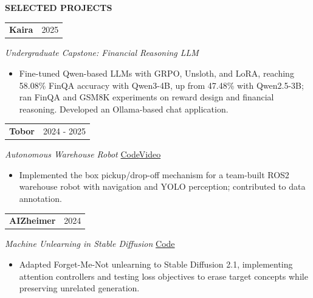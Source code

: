 \documentclass[11pt,a4paper]{article}
\makeatletter
\newcommand{\cvlink}[2]{\href{#1}{\textcolor{linkblue}{#2}}}
\newcommand{\cvsep}{\enspace\textperiodcentered\enspace{}}
\newcommand{\cvsection}[3][5]{%
  \par\Needspace*{#1\baselineskip}\vspace{6pt}%
  {\bfseries\fontsize{11}{13}\selectfont #3}\par\nobreak
  \vspace{3pt}{\color{muted}\hrule height 0.4pt}\nobreak\vspace{6pt}%
}
\newcommand{\cvheading}[2]{%
  \begin{tabularx}{\linewidth}{@{}>{\raggedright\arraybackslash}X@{\hspace{10pt}}r@{}}%
  \textbf{#1} & {\small\color{muted}#2}\\
  \end{tabularx}\par\nobreak
}
\newenvironment{cvpoints}{\begin{itemize}[leftmargin=12pt,itemsep=2pt,topsep=2pt,parsep=0pt]\small}{\end{itemize}}
\makeatother
\begin{document}
\cvsection{}{SELECTED PROJECTS}
\begin{minipage}{\linewidth}\raggedright
\cvheading{Kaira}{2025}
{\small{}\itshape{}\color{muted}Undergraduate Capstone: Financial Reasoning LLM}\hfill{\small{}%
%
}\par\vspace{2pt}
\begin{cvpoints}
\item Fine-tuned Qwen-based LLMs with GRPO, Unsloth, and LoRA, reaching 58.08\% FinQA accuracy with Qwen3-4B, up from 47.48\% with Qwen2.5-3B; ran FinQA and GSM8K experiments on reward design and financial reasoning. Developed an Ollama-based chat application.
\end{cvpoints}
\end{minipage}\par\vspace{5pt}
\begin{minipage}{\linewidth}\raggedright
\cvheading{Tobor}{2024 - 2025}
{\small{}\itshape{}\color{muted}Autonomous Warehouse Robot}\hfill{\small{}%
\mbox{\cvlink{https://github.com/rusen-archive/Amazon-Warehouse-Robot}{Code}}\cvsep\mbox{\cvlink{https://youtu.be/h-Jxs_y9kNA}{Video}}%
}\par\vspace{2pt}
\begin{cvpoints}
\item Implemented the box pickup/drop-off mechanism for a team-built ROS2 warehouse robot with navigation and YOLO perception; contributed to data annotation.
\end{cvpoints}
\end{minipage}\par\vspace{5pt}
\begin{minipage}{\linewidth}\raggedright
\cvheading{AIZheimer}{2024}
{\small{}\itshape{}\color{muted}Machine Unlearning in Stable Diffusion}\hfill{\small{}%
\mbox{\cvlink{https://github.com/rusenbb/ai-zheimer}{Code}}%
}\par\vspace{2pt}
\begin{cvpoints}
\item Adapted Forget-Me-Not unlearning to Stable Diffusion 2.1, implementing attention controllers and testing loss objectives to erase target concepts while preserving unrelated generation.
\end{cvpoints}
\end{minipage}\par\vspace{5pt}
\end{document}
